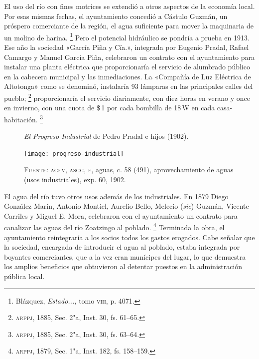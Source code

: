 \documentclass[14pt,twoside,final]{extbook} %
\let\oldfootnote\footnote
\renewcommand\footnote[1]{%
\oldfootnote{\hspace{1mm}#1}}
\begin{document}
El uso del río con fines motrices se extendió a otros aspectos de la economía local. Por esas mismas fechas, el ayuntamiento concedió a Cástulo Guzmán, un próspero comerciante de la región, el agua suficiente para mover la maquinaria de un molino de harina.\footnote{Blázquez, \emph{Estado...,} tomo \textsc{viii}, p. 4071.} Pero el potencial hidráulico se pondría a prueba en 1913. Ese año la sociedad «García Piña y Cía.», integrada por Eugenio Pradal, Rafael Camargo y Manuel García Piña, celebraron un contrato con el ayuntamiento para instalar una planta eléctrica que proporcionaría el servicio de alumbrado público en la cabecera municipal y las inmediaciones. La «Compañía de Luz Eléctrica de Altotonga» como se denominó, instalaría 93 lámparas en las principales calles del pueblo;\footnote{\textsc{arppj}, 1885, Sec. 2"a, Inst. 30, fs. 61--65.} proporcionaría el servicio diariamente, con diez horas en verano y once en invierno, con una cuota de \$\,1 por cada bombilla de 18\,W en cada casa-habitación.\footnote{\textsc{arppj}, 1885, Sec. 2"a, Inst. 30, fs. 63--64.}
\begin{figure}
\centering
\caption[\emph{El Progreso Industrial} de Pedro Pradal e hijos (1902)]{\emph{El Progreso Industrial} de Pedro Pradal e hijos (1902).}
\texttt{[image: progreso-industrial]}
\caption*{\textsc{Fuente:} \textsc{agev, asgg, f}, aguas, c. 58 (491), aprovechamiento de aguas (usos industriales), exp. 60, 1902.}
\label{fig:progreso-industrial}
\end{figure}

El agua del río tuvo otros usos además de los industriales. En 1879 Diego González Marín, Antonio Montiel, Aurelio Bello, Melecio (\emph{sic}) Guzmán, Vicente Carriles y Miguel E. Mora, celebraron con el ayuntamiento un contrato para canalizar las aguas del río Zoatzingo al poblado.\footnote{\textsc{arppj}, 1879, Sec. 1"a, Inst. 182, fs. 158--159.} Terminada la obra, el ayuntamiento reintegraría a los socios todos los gastos erogados. Cabe señalar que la sociedad, encargada de introducir el agua al poblado, estaba integrada por boyantes comerciantes, que a la vez eran munícipes del lugar, lo que demuestra los amplios beneficios que obtuvieron al detentar puestos en la administración pública local.\protect\enlargethispage*{\baselineskip}
\end{document}
